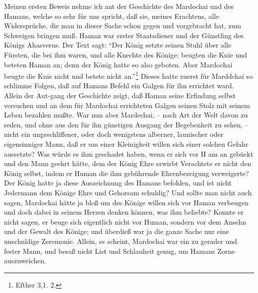 Meinen ersten Beweis nehme ich ant der Geschichte des Mardochai und des Hamans,
welche so sehr für uns spricht, daß sie, meines Erachtens, alle Widersprüche,
die man in dieser Sache schon gegen und vorgebracht hat, zum Schweigen bringen
muß. Haman war erster Staatsdiener und der Günstling des Königs Ahasverus. Der
Text sagt: "`Der König setzte seinen Stuhl über alle Fürsten, die bei ihm waren,
und alle Knechte des Könige; beugten die Knie und beteten Haman an; denn der
König hatte eo also geboten. Aber Mardochai beugte die Knie nicht und betete
nicht an."'\footnote{Efther 3,1. 2.} Dieses hatte zuerst für Marddchai so
schlimme Folgen, daß auf Hamans Befehl ein Galgen für ihn errichtet ward. Allein
der Aut-gang der Geschichte zeigt, daß Haman seine Erfindung selbst versuchen
und an dem für Mardochai errichteten Galgen seinen Stolz mit seinem Leben
bezahlen mußte. War nun aber Mardechai, -- nach Art der Welt davon zu reden, und
ohne aus den für ihn günstigen Ausgang der Begebenheit zu sehen, -- nicht ein
ungeschliffener, oder doch wenigstens alberner, launischer oder eigensinniger
Mann, daß er um einer Kleinigkeit willen sich einer solchen Gefahr aussetzte?
Was würde es ihm geschadet haben, wenn er sich vor
H am an gebückt und den Mann geehrt hätte, dem der König Ehre erwirbt Verachtete
er nicht den König selbst, indem er Human die ihm gebührende Ehrenbezeigung
verweigerte? Der König hatte ja diese Auszeichnung des Hamans befohlen, und ist
nicht Jedermann dem Könige Ehre und Gehorsam schuldig? Und sollte man nicht auch
sagen, Mardochai hätte ja bloß um des Könige willen sich vor Haman verbeugen und
doch dabei in seinem Herzen denken können, was ihm beliebte? Konnte er nicht
sagen, er beuge sich eigentlich nicht vor Human, sondern vor dem Ansehn und der
Gewalt des Könige; und überdieß war ja die ganze Sache nur eine unschuldige
Zeremonie. Allein, es scheint, Mardochai war ein zu gerader und fester Mann, und
besaß nicht List und Schlauheit genug, um Hamans Zorne auszuweichen.

